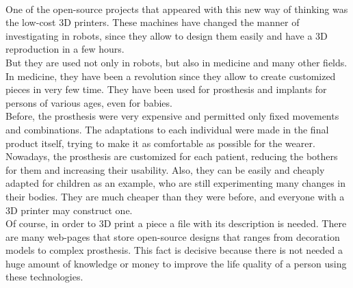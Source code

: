 \\



One of the open-source projects that appeared with this new way of thinking was the low-cost 3D printers. These machines have changed the manner of investigating in robots, since they allow to design them easily and have a 3D reproduction in a few hours. 
\\

But they are used not only in robots, but also in medicine and many other fields. In medicine, they have been a revolution since they allow to create customized pieces in very few time. They have been used for prosthesis and implants for persons of various ages, even for babies. 
\\

Before, the prosthesis were very expensive and permitted only fixed movements and combinations. The adaptations to each individual were made in the final product itself, trying to make it as comfortable as possible for the wearer. Nowadays, the prosthesis are customized for each patient, reducing the bothers for them and increasing their usability. Also, they can be easily and cheaply adapted for children as an example, who are still experimenting many changes in their bodies. They are much cheaper than they were before, and everyone with a 3D printer may construct one. 
\\

Of course, in order to 3D print a piece a file with its description is needed. There are many web-pages that store open-source designs that ranges from decoration models to complex prosthesis. This fact is decisive because there is not needed a huge amount of knowledge or money to improve the life quality of a person using these technologies. 
\\

